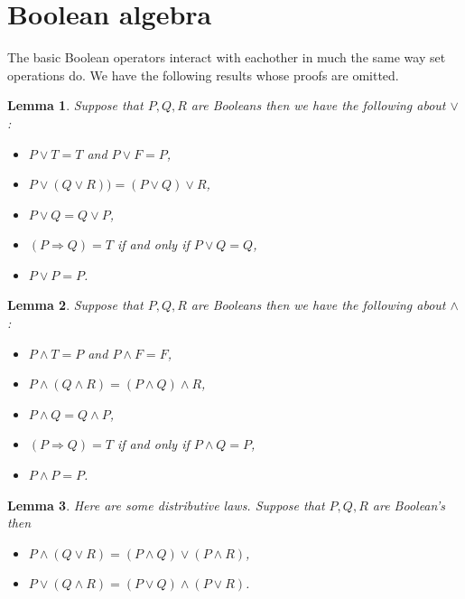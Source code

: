 \documentclass[
]{book}
\newtheorem{lemma}{Lemma}[chapter]
\theoremstyle{definition}
\theoremstyle{definition}
\theoremstyle{definition}
\theoremstyle{definition}
\theoremstyle{remark}
\begin{document}
\section{Boolean algebra}\label{boolean-algebra}

The basic Boolean operators interact with eachother in much the same way set operations do. We have the following results whose proofs are omitted.

\begin{lemma}

Suppose that \(P, Q, R\) are Booleans then we have the following about \(\vee\):

\begin{itemize}
\item
  \(P \vee T = T\) and \(P \vee F = P\),
\item
  \(P \vee (Q \vee R)) =(P\vee Q) \vee R\),
\item
  \(P \vee Q = Q \vee P\),
\item
  \((P \Rightarrow Q) = T\) if and only if \(P \vee Q = Q\),
\item
  \(P \vee P = P\).
\end{itemize}

\end{lemma}

\begin{lemma}

Suppose that \(P, Q, R\) are Booleans then we have the following about \(\wedge\):

\begin{itemize}
\item
  \(P \wedge T = P\) and \(P \wedge F = F\),
\item
  \(P \wedge (Q \wedge R)= (P\wedge Q) \wedge R\),
\item
  \(P \wedge Q = Q \wedge P\),
\item
  \((P \Rightarrow Q)= T\) if and only if \(P \wedge Q = P\),
\item
  \(P \wedge P = P\).
\end{itemize}

\end{lemma}

\begin{lemma}

Here are some distributive laws. Suppose that \(P, Q, R\) are Boolean's then

\begin{itemize}
\item
  \(P \wedge (Q \vee R) = (P \wedge Q) \vee (P \wedge R)\),
\item
  \(P \vee (Q \wedge R) = (P \vee Q) \wedge (P \vee R)\).
\end{itemize}

\end{lemma}
\end{document}
